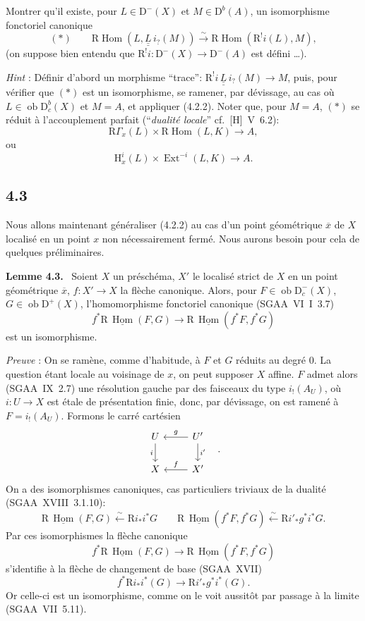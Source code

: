 \documentclass[11pt]{article}
\newenvironment{statement}[1]{\par\medskip\noindent\textbf{#1.}\ }{\par\medskip}
\renewcommand{\H}{\mathrm{H}}
\DeclareMathOperator{\Hom}{Hom}
\DeclareMathOperator{\Ext}{Ext}
\newcommand{\R}{\mathrm{R}}\newcommand{\RHomCore}{\mathrm{RHom}}
\newcommand{\D}{\mathrm{D}}
\newcommand{\ob}{\operatorname{ob}}
\newcommand{\ol}[1]{\overline{#1}}
\providecommand{\Hom}{\operatorname{Hom}}
\providecommand{\ob}{\operatorname{ob}}
\providecommand{\R}{\mathrm R}
\providecommand{\Hom}{\operatorname{Hom}}
\begin{document}
Montrer qu'il existe, pour $L\in\D^-(X)$ et $M\in\D^b(A)$, un isomorphisme fonctoriel canonique
\[
(*)\qquad \R\Hom(L,\underline{\underline{L}}\, i_?(M))\xrightarrow{\sim}\R\Hom(\R^{!}i(L),M),
\]
(on suppose bien entendu que $\R^{!}i:\D^-(X)\to\D^-(A)$ est défini \dots).

\emph{Hint} : Définir d'abord un morphisme ``trace'': $\R^{!}i\,\underline{\underline{L}}\, i_?(M)\to M$, puis, pour vérifier que $(*)$ est un isomorphisme, se ramener, par dévissage, au cas où $L\in\ob\D_c^b(X)$ et $M=A$, et appliquer (4.2.2). Noter que, pour $M=A$, $(*)$ se réduit à l'accouplement parfait (``\emph{dualité locale}'' cf.~[H]~V~6.2):
\[
\R\Gamma_x(L)\times \R\Hom(L,K)\longrightarrow A,
\]
ou
\[
\H_x^i(L)\times \Ext^{-i}(L,K)\longrightarrow A.
\]

\subsection*{4.3}
Nous allons maintenant généraliser (4.2.2) au cas d'un point géométrique $\ol{x}$ de $X$ localisé en un point $x$ non nécessairement fermé. Nous aurons besoin pour cela de quelques préliminaires.

\begin{statement}{Lemme 4.3}
Soient $X$ un préschéma, $X'$ le localisé strict de $X$ en un point géométrique $\ol{x}$, $f:X'\to X$ la flèche canonique. Alors, pour $F\in\ob\D_c^-(X)$, $G\in\ob\D^+(X)$, l'homomorphisme fonctoriel canonique (SGAA~VI~I~3.7)
\[
f^*\R\,\underline{\Hom}(F,G)\longrightarrow \R\,\underline{\Hom}(f^*F,f^*G)
\]
est un isomorphisme.
\end{statement}

\emph{Preuve} : On se ramène, comme d'habitude, à $F$ et $G$ réduits au degré $0$. La question étant locale au voisinage de $x$, on peut supposer $X$ affine. $F$ admet alors (SGAA~IX~2.7) une résolution gauche par des faisceaux du type $i_!(A_U)$, où $i:U\to X$ est étale de présentation finie, donc, par dévissage, on est ramené à $F=i_!(A_U)$. Formons le carré cartésien
\[
\begin{tikzcd}
U \arrow[d,"i"'] & U' \arrow[l,"g"'] \arrow[d,"i'"] \\
X & X' \arrow[l,"f"']
\end{tikzcd}\quad .
\]
On a des isomorphismes canoniques, cas particuliers triviaux de la dualité (SGAA~XVIII~3.1.10):
\[
\R\,\underline{\Hom}(F,G)\xleftarrow{\sim}\R i_* i^*G
\qquad
\R\,\underline{\Hom}(f^*F,f^*G)\xleftarrow{\sim}\R i'_* g^*i^*G.
\]
Par ces isomorphismes la flèche canonique
\[
f^*\R\,\underline{\Hom}(F,G)\longrightarrow \R\,\underline{\Hom}(f^*F,f^*G)
\]
s'identifie à la flèche de changement de base (SGAA~XVII)
\[
f^*\R i_*i^*(G)\longrightarrow \R i'_*g^*i^*(G).
\]
Or
celle-ci est un isomorphisme, comme on le voit aussitôt par passage à la limite (SGAA~VII~5.11).
\end{document}
